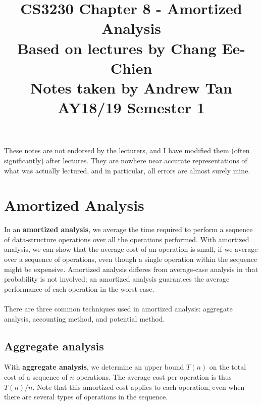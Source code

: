\documentclass[a4paper]{article}
\title{%
	CS3230 Chapter 8 - Amortized Analysis \\
	\large Based on lectures by Chang Ee-Chien
	\\ Notes taken by Andrew Tan
	\\ AY18/19 Semester 1
	\\ }
\author{}
\date{\vspace{-5ex}}
\begin{document}
\maketitle

\begin{center}\begin{minipage}[c]{0.9\textwidth}\centering\footnotesize These notes are not endorsed by the lecturers, and I have modified them (often significantly) after lectures. They are nowhere near accurate representations of what was actually lectured, and in particular, all errors are almost surely mine.\end{minipage}\end{center}

\section{Amortized Analysis}
In an \textbf{amortized analysis}, we average the time required to perform a sequence of data-structure operations over all the operations performed. With amortized analysis, we can show that the average cost of an operation is small, if we average over a sequence of operations, even though a single operation within the sequence might be expensive. Amortized analysis differes from average-case analysis in that probability is not involved; an amortized analysis guarantees the average performance of each operation in the worst case.\\\\
There are three common techniques used in amortized analysis: aggregate analysis, accounting method, and potential method.
\subsection{Aggregate analysis}
With \textbf{aggregate analysis}, we determine an upper bound $T(n)$ on the total cost of a sequence of $n$ operations. The average cost per operation is thus $T(n)/n$. Note that this amortized cost applies to each operation, even when there are several types of operations in the sequence.
\end{document}
